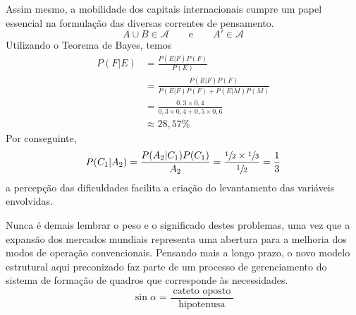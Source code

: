 \begin{apendicesenv}
    Assim mesmo, a mobilidade dos capitais internacionais cumpre um papel essencial
    na formulação das diversas correntes de pensamento.
    \[ A\cup B \in \mathcal{A} \qquad  \text{e} \qquad  A'\in \mathcal{A} \]
    Utilizando o Teorema de Bayes, temos
    \begin{align*}
        P(F|E) & = \frac{P(E|F)P(F)}{P(E)}                                \\[3mm]
               & = \frac{P(E|F)P(F)}{P(E|F)P(F) + P(E|M)P(M)}             \\[3mm]
               & = \frac{0,3 \times 0,4}{0,3 \times 0,4 + 0,5 \times 0,6} \\[3mm]
               & \approx 28,57\%
    \end{align*}
    Por conseguinte,
    \[
        P(C_{1}|A_{2}) = \frac{P(A_{2}|C_{1})P(C_{1})}{A_{2}}
        = \frac{\sfrac{1}{2} \times \sfrac{1}{3}}{\sfrac{1}{2}}
        = \frac{1}{3}
    \]
    a percepção das dificuldades facilita a criação do levantamento
    das variáveis envolvidas.

    Nunca é demais lembrar o peso e o significado destes
    problemas, uma vez que a expansão dos mercados mundiais representa uma abertura
    para a melhoria dos modos de operação convencionais. Pensando mais a longo
    prazo, o novo modelo estrutural aqui preconizado faz parte de um processo de
    gerenciamento do sistema de formação de quadros que corresponde às necessidades.
    \[
        \sin \alpha = \frac{\;\text{cateto oposto}\;}{\text{hipotenusa}}
    \]


\end{apendicesenv}
